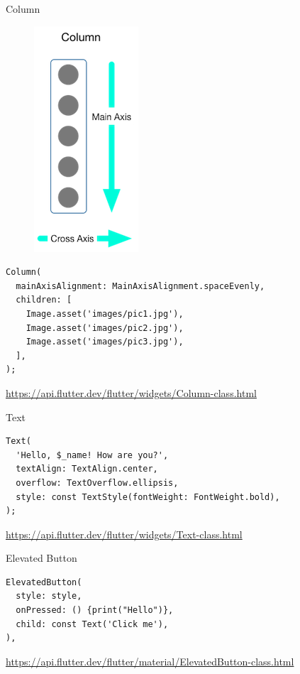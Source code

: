 \begin{frame}[containsverbatim]{Column}

  \begin{figure}[h]
    \includegraphics[height=0.25\textwidth]{images/column-diagram.png}
  \end{figure}

  \begin{verbatim}
Column(
  mainAxisAlignment: MainAxisAlignment.spaceEvenly,
  children: [
    Image.asset('images/pic1.jpg'),
    Image.asset('images/pic2.jpg'),
    Image.asset('images/pic3.jpg'),
  ],
);
  \end{verbatim}
  \footnotesize
  \url{https://api.flutter.dev/flutter/widgets/Column-class.html}
\end{frame}

\begin{frame}[containsverbatim]{Text}

  \begin{verbatim}
Text(
  'Hello, $_name! How are you?',
  textAlign: TextAlign.center,
  overflow: TextOverflow.ellipsis,
  style: const TextStyle(fontWeight: FontWeight.bold),
);
	\end{verbatim}
  \footnotesize
  \url{https://api.flutter.dev/flutter/widgets/Text-class.html}
\end{frame}

\begin{frame}[containsverbatim]{Elevated Button}

  \begin{verbatim}
ElevatedButton(
  style: style,
  onPressed: () {print("Hello")},
  child: const Text('Click me'),
),
	\end{verbatim}
  \footnotesize
  \url{https://api.flutter.dev/flutter/material/ElevatedButton-class.html}
\end{frame}

